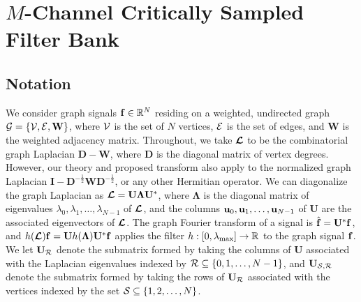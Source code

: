 \documentclass[journal, 10pt]{IEEEtran}
\begin{document}
\section{$M$-Channel Critically Sampled Filter Bank} \label{Se:fb_design}

\subsection{Notation}
We consider graph signals ${\bf f} \in \mathbb{R}^N$ residing on a weighted, undirected graph ${\mathcal{G}}=\{{\mathcal{V}},{\mathcal{E}},\mathbf{W}\}$, where ${\mathcal{V}}$ is the set of $N$ vertices, ${\mathcal{E}}$ is the set of edges, and $\mathbf{W}$ is the weighted adjacency matrix. 
Throughout, we take $\boldsymbol{\mathcal{L}}$ to be the combinatorial graph Laplacian $\mathbf{D}-\mathbf{W}$, where $\mathbf{D}$ is the diagonal matrix of vertex degrees. However, our theory and proposed transform also apply to the normalized graph Laplacian $\mathbf{I}-\mathbf{D}^{-\frac{1}{2}}\mathbf{W}\mathbf{D}^{-\frac{1}{2}}$, or any other Hermitian operator. We can diagonalize the graph Laplacian as $\boldsymbol{\mathcal{L}}=\mathbf{U}{\boldsymbol \Lambda}\mathbf{U}^{*}$, where ${\boldsymbol \Lambda}$ is the diagonal matrix of eigenvalues $\lambda_0,\lambda_1,\ldots,\lambda_{N-1}$ of $\boldsymbol{\mathcal{L}}$, and the columns ${\bf u}_0,{\bf u}_1,\ldots,{\bf u}_{N-1}$ of $\mathbf{U}$ are the associated eigenvectors of $\boldsymbol{\mathcal{L}}$. The graph Fourier transform of a signal is $\hat{\bf{f}}=\mathbf{U}^{*}{\bf f}$, and ${h}(\boldsymbol{\mathcal{L}}){\bf f}=\mathbf{U}{h}({\boldsymbol \Lambda})\mathbf{U}^{*}{\bf f}$ applies the filter ${h}: [0,\lambda_{\max}] \rightarrow \mathbb{R}$ to the graph signal ${\bf f}$. We %
let $\mathbf{U}_{{\cal R}}$ %
denote the submatrix formed by taking the columns of $\mathbf{U}$ associated with the Laplacian eigenvalues indexed by ${\cal R} \subseteq \{0,1,\ldots,N-1\}$, %
and %
$\mathbf{U}_{{\cal S},{\cal R}}$ %
denote the submatrix  formed by taking the rows of $\mathbf{U}_{{\cal R}}$ associated with the vertices indexed by the set ${\cal S} \subseteq \{1,2,\ldots,N\}$.
\end{document}
